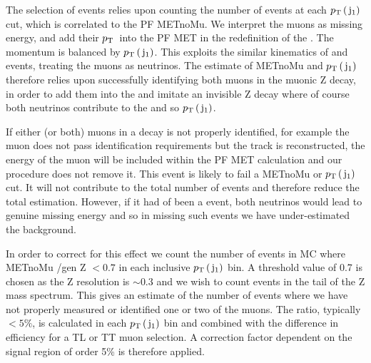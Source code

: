 The selection of \zmumu events relies upon counting the number of events at each $p_{\text{T}}\,(\,\mathrm{j}_1)$ cut, which is correlated to the PF METnoMu.
We interpret the muons as missing energy, and add their $p_{\text{T}}\,$ into the PF MET in the redefinition of the \MET.
The momentum is balanced by $p_{\text{T}}\,(\,\mathrm{j}_1)$.
This exploits the similar kinematics of \znunu and \zmumu events, treating the muons as neutrinos. 
The estimate of METnoMu and $p_{\text{T}}\,(\,\mathrm{j}_1)$ therefore relies upon successfully identifying both muons in the muonic Z decay, 
in order to add them into the \MET and imitate an invisible Z decay where of course both neutrinos contribute to the \MET and so $p_{\text{T}}\,(\,\mathrm{j}_1)$. 

If either (or both) muons in a \zmumu decay is not properly identified, 
for example the muon does not pass identification requirements but the track is reconstructed, 
the energy of the muon will be included within the PF MET calculation and our procedure does not remove it. 
This event is likely to fail a METnoMu or $p_{\text{T}}\,(\,\mathrm{j}_1)$ cut.
It will not contribute to the total number of \zmumu events and therefore reduce the total \znunu estimation.
However, if it had of been a \znunu event, 
both neutrinos would lead to genuine missing energy and so in missing such events we have under-estimated the \znunu background.

In order to correct for this effect we count the number of events in MC where METnoMu /\pt gen Z $< 0.7$ in each inclusive $p_{\text{T}}\,(\,\mathrm{j}_1)$ bin. 
A threshold value of 0.7 is chosen as the Z resolution is $\sim 0.3$ and we wish to count events in the tail of the Z mass spectrum.
This gives an estimate of the number of events where we have not properly measured or identified one or two of the muons. 
The ratio, typically $<5\%$, is calculated in each $p_{\text{T}}\,(\,\mathrm{j}_1)$ bin and combined with the difference in efficiency for a TL or TT muon selection.
A correction factor dependent on the signal region of order 5\% is therefore applied.


